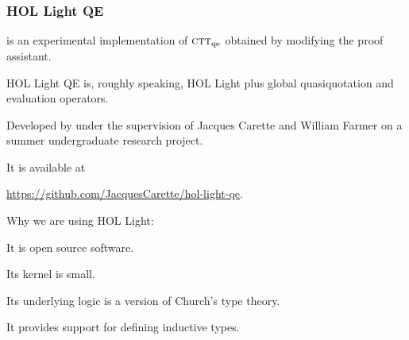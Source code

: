 \documentclass[t,12pt,numbers,fleqn]{beamer}
\newcommand{\churchqe}{$\mbox{\sc ctt}_{\rm qe}$}
\begin{document}
\begin{frame}
\frametitle{HOL Light QE}
\bi

  \item {} is an experimental implementation of
    {\churchqe} obtained by modifying the  proof
    assistant.

  \bi

    \item HOL Light QE is, roughly speaking, HOL Light plus global
      quasiquotation and evaluation operators.

    \item Developed by  under the
      supervision of Jacques Carette and William Farmer on a summer
      undergraduate research project.

    \item It is available at

    \bi

      \item[] \href{https://github.com/JacquesCarette/hol-light-qe}
        {https://github.com/JacquesCarette/hol-light-qe}.

    \ei

  \ei

  \item Why we are using HOL Light:

  \be

    \item It is open source software.

    \item Its kernel is small.

    \item Its underlying logic is a version of Church's type theory.

    \item It provides support for defining inductive types.

  \ee

\ei
\end{frame}

\end{document}
